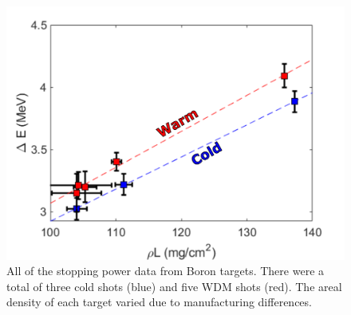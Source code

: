 \begin{figure}[!h]
    \centering
    \includegraphics[scale=0.7]{Figures/bWDMData.pdf}
    \caption[Stopping power data from Boron Targets]{All of the stopping power data from Boron targets. There were a total of three cold shots (blue) and five WDM shots (red). The areal density of each target varied due to manufacturing differences.}
    \label{fig:boronWDMData}
\end{figure}

